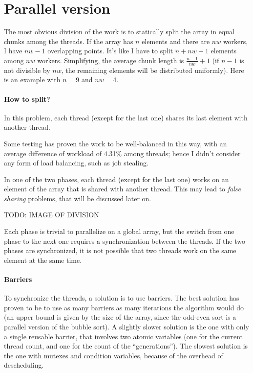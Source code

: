 \section{Parallel version}
The most obvious division of the work is to statically split the array in equal chunks among the threads. If the array has $n$ elements and there are $nw$ workers, I have $nw - 1$ overlapping points. It's like I have to split $n + nw - 1$ elements among $nw$ workers. Simplifying, the average chunk length is $\frac{n - 1}{nw} + 1$ (if $n - 1$ is not divisible by $nw$, the remaining elements will be distributed uniformly). Here is an example with $n = 9$ and $nw = 4$.

\paragraph{How to split?}
In this problem, each thread (except for the last one) shares its last element with another thread. 
\bigbreak

Some testing has proven the work to be well-balanced in this way, with an average difference of workload of 4.31\% among threads; hence I didn't consider any form of load balancing, such as job stealing.

In one of the two phases, each thread (except for the last one) works on an element of the array that is shared with another thread. This may lead to \textit{false sharing} problems, that will be discussed later on.

TODO: IMAGE OF DIVISION

Each phase is trivial to parallelize on a global array, but the switch from one phase to the next one requires a synchronization between the threads. If the two phases are synchronized, it is not possible that two threads work on the same element at the same time.
\bigbreak

\paragraph{Barriers}
To synchronize the threads, a solution is to use barriers. The best solution has proven to be to use as many barriers as many iterations the algorithm would do (an upper bound is given by the size of the array, since the odd-even sort is a parallel version of the bubble sort). A slightly slower solution is the one with only a single reusable barrier, that involves two atomic variables (one for the current thread count, and one for the count of the ``generations''). The slowest solution is the one with mutexes and condition variables, because of the overhead of descheduling.
\bigbreak

